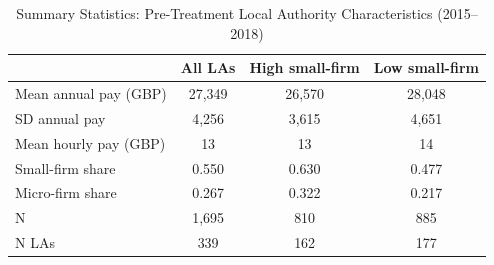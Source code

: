 \begin{table}[t]
\centering
\caption{Summary Statistics: Pre-Treatment Local Authority Characteristics (2015--2018)}
\label{tab:sumstats}
\begin{tabular}{lccc}
\toprule
 & All LAs & High small-firm & Low small-firm \\
\midrule
Mean annual pay (GBP) & 27,349 & 26,570 & 28,048 \\
SD annual pay & 4,256 & 3,615 & 4,651 \\
Mean hourly pay (GBP) & 13 & 13 & 14 \\
Small-firm share & 0.550 & 0.630 & 0.477 \\
Micro-firm share & 0.267 & 0.322 & 0.217 \\
N & 1,695 & 810 & 885 \\
N LAs & 339 & 162 & 177 \\
\bottomrule
\end{tabular}
\par{}
\end{table}

